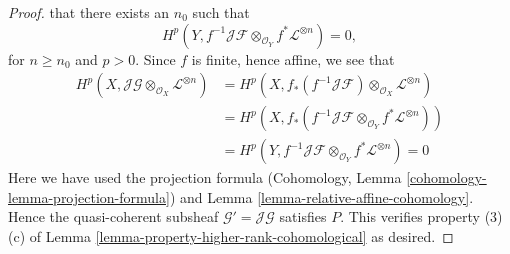 \begin{proof}
that there exists an $n_0$ such that
$$
H^p(Y, f^{-1}\mathcal{J}\mathcal{F}
\otimes_{\mathcal{O}_Y} f^*\mathcal{L}^{\otimes n}) = 0,
$$
for $n \geq n_0$ and $p > 0$. Since $f$ is finite, hence affine, we see that
\begin{align*}
H^p(X, \mathcal{J}\mathcal{G} \otimes_{\mathcal{O}_X}
\mathcal{L}^{\otimes n})
& =
H^p(X, f_*(f^{-1}\mathcal{J}\mathcal{F}) \otimes_{\mathcal{O}_X}
\mathcal{L}^{\otimes n}) \\
& =
H^p(X, f_*(f^{-1}\mathcal{J}\mathcal{F} \otimes_{\mathcal{O}_Y}
f^*\mathcal{L}^{\otimes n})) \\
& =
H^p(Y, f^{-1}\mathcal{J}\mathcal{F} \otimes_{\mathcal{O}_Y}
f^*\mathcal{L}^{\otimes n}) = 0
\end{align*}
Here we have used the projection formula
(Cohomology, Lemma \ref{cohomology-lemma-projection-formula}) and
Lemma \ref{lemma-relative-affine-cohomology}.
Hence the quasi-coherent subsheaf $\mathcal{G}' = \mathcal{J}\mathcal{G}$
satisfies $P$. This verifies property (3)(c) of
Lemma \ref{lemma-property-higher-rank-cohomological} as desired.
\end{proof}